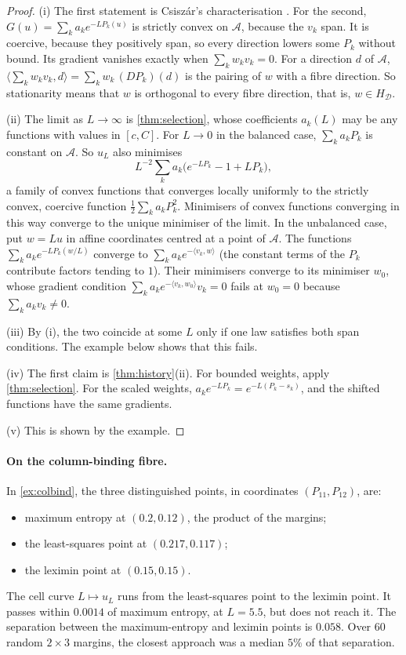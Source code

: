 \documentclass[11pt]{article}
\theoremstyle{definition}\newtheorem{definition}[theorem]{Definition}\newtheorem{remark}[theorem]{Remark}\newtheorem{example}[theorem]{Example}\newtheorem{problem}[theorem]{Open problem}\crefname{problem}{Problem}{Problems}
\begin{document}
\begin{proof}
(i) The first statement is Csisz\'ar's characterisation \cite{Csiszar1975}. For the second, $G(u)=\sum_ka_ke^{-LP_k(u)}$ is strictly convex on $\mathcal A$, because the $v_k$ span. It is coercive, because they positively span, so every direction lowers some $P_k$ without bound. Its gradient vanishes exactly when $\sum_kw_kv_k=0$. For a direction $d$ of $\mathcal A$, $\langle\sum_kw_kv_k,d\rangle=\sum_kw_k\,(DP_k)(d)$ is the pairing of $w$ with a fibre direction. So stationarity means that $w$ is orthogonal to every fibre direction, that is, $w\in H_{\mathcal D}$.

(ii) The limit as $L\to\infty$ is \cref{thm:selection}, whose coefficients $a_k(L)$ may be any functions with values in $[c,C]$. For $L\to0$ in the balanced case, $\sum_ka_kP_k$ is constant on $\mathcal A$. So $u_L$ also minimises
\[
L^{-2}\sum_ka_k\big(e^{-LP_k}-1+LP_k\big),
\]
a family of convex functions that converges locally uniformly to the strictly convex, coercive function $\tfrac12\sum_ka_kP_k^2$. Minimisers of convex functions converging in this way converge to the unique minimiser of the limit. In the unbalanced case, put $w=Lu$ in affine coordinates centred at a point of $\mathcal A$. The functions $\sum_ka_ke^{-LP_k(w/L)}$ converge to $\sum_ka_ke^{-\langle v_k,w\rangle}$ (the constant terms of the $P_k$ contribute factors tending to $1$). Their minimisers converge to its minimiser $w_0$, whose gradient condition $\sum_ka_ke^{-\langle v_k,w_0\rangle}v_k=0$ fails at $w_0=0$ because $\sum_ka_kv_k\ne0$.

(iii) By (i), the two coincide at some $L$ only if one law satisfies both span conditions. The example below shows that this fails.

(iv) The first claim is \cref{thm:history}(ii). For bounded weights, apply \cref{thm:selection}. For the scaled weights, $a_ke^{-LP_k}=e^{-L(P_k-s_k)}$, and the shifted functions have the same gradients.

(v) This is shown by the example.
\end{proof}

\paragraph{On the column-binding fibre.} In \cref{ex:colbind}, the three distinguished points, in coordinates $(P_{11},P_{12})$, are:
\begin{itemize}
\item maximum entropy at $(0.2,0.12)$, the product of the margins;
\item the least-squares point at $(0.217,0.117)$;
\item the leximin point at $(0.15,0.15)$.
\end{itemize}
The cell curve $L\mapsto u_L$ runs from the least-squares point to the leximin point. It passes within $0.0014$ of maximum entropy, at $L=5.5$, but does not reach it. The separation between the maximum-entropy and leximin points is $0.058$. Over $60$ random $2\times3$ margins, the closest approach was a median $5\%$ of that separation.
\end{document}
